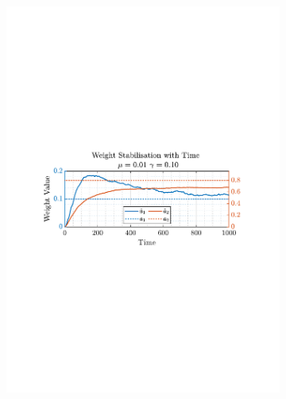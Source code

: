 \documentclass[12pt]{article}
\numberwithin{equation}{section}
\begin{document}
\begin{figure}[H]
\begin{subfigure}{0.49\textwidth}
					\includegraphics[trim={2.2cm 11.2cm 3.00cm  11.2cm}, clip, width=\textwidth]{../MATLAB/figures/q2_1f_fig02.pdf} 
					\captionsetup{justification=centering}
				\end{subfigure}
			

\end{figure}
\end{document}
